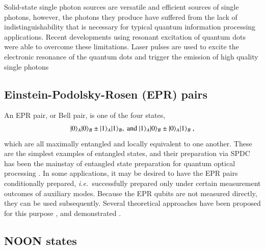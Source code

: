 \documentclass[times,final]{elsarticle}
\newcommand{\ket}[1]{|#1\rangle}
\begin{document}

Solid-state single photon sources are versatile and efficient sources of single photons, however, the photons they produce have suffered from the lack of indistinguishability that is necessary for typical quantum information processing applications. Recent developments using resonant excitation of quantum dots were able to overcome these limitations. Laser pulses are used to excite the electronic resonance of the quantum dots and trigger the emission of high quality single photons \cite{bib:WangHe16}

\subsection{Einstein-Podolsky-Rosen (EPR) pairs}

An EPR pair, or Bell pair, is one of the four states,
\begin{align}
\ket{0}_A\ket{0}_B \pm \ket{1}_A\ket{1}_B, \ {\rm and} \ \ket{1}_A\ket{0}_B \pm \ket{0}_A\ket{1}_B \ ,
\end{align}
which are all maximally entangled and locally equivalent to one another. These are the simplest examples of entangled states, and their preparation via SPDC has been the mainstay of entangled state preparation for quantum optical processing \cite{bib:Kim01}.
In some applications, it may be desired to have the EPR pairs conditionally prepared, {\it i.e.~}successfully prepared only under certain measurement outcomes of auxiliary modes. Because the EPR qubits are not measured directly, they can be used subsequently. Several theoretical approaches have been proposed for this purpose \cite{bib:Pittman03,bib:Sliwa03,bib:Walther07}, and demonstrated \cite{bib:Wagenknecht10,bib:Barz10}.

\subsection{NOON states}
\end{document}
